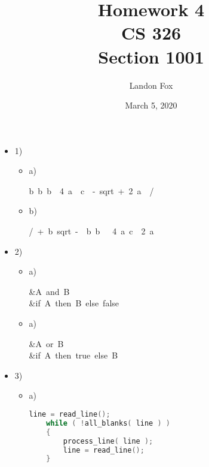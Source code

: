 \documentclass[ 12pt ]{article}
\begin{document}
\title{%
	Homework 4 \\
	\large CS 326 \\
	Section 1001}
\author{Landon Fox}
\date{March 5, 2020}
\maketitle
\newpage


\begin{itemize}
	\item[] {1) \large}
	\begin{itemize}
		\item[] a)
		\begin{flalign}
			b\, b\, b\, \times\, 4\, a\, \times\, c\, \times\, -\, sqrt\, +\, 2\, a\, \times\, / \nonumber
		\end{flalign}

		\item[] b)
		\begin{flalign}
			/\, +\, b\, sqrt\, -\, \times\, b\, b\, \times\, \times\, 4\, a\, c\, \times\, 2\, a \nonumber
		\end{flalign}
	\end{itemize}

	\item[] {2) \large}
	\begin{itemize}
		\item[] a)
		\begin{flalign}
			&A\, and\, B \nonumber \\
			&if\, A\, then\, B\, else\, false \nonumber
		\end{flalign}

		\item[] a)
		\begin{flalign}
			&A\, or\, B \nonumber \\
			&if\, A\, then\, true\, else\, B \nonumber
		\end{flalign}
	\end{itemize}

	\item[] {3) \large}
	\begin{itemize}
		\item[] a)
		\begin{lstlisting}[language=C]
    line = read_line();
    while ( !all_blanks( line ) )
    {
        process_line( line );
        line = read_line();
    }
		\end{lstlisting}


\end{itemize}
\end{itemize}
\end{document}
